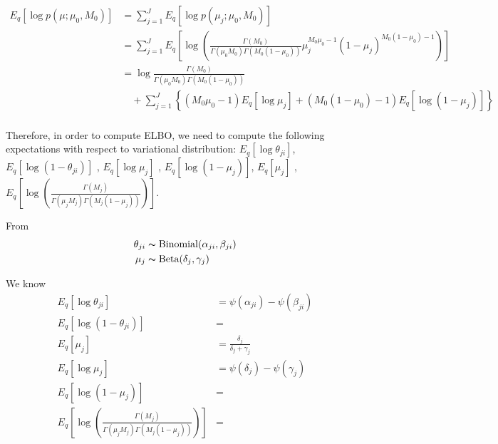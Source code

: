 \documentclass[11pt,reqno]{amsart}
\begin{document}
\begin{equation}
\begin{split}
\label{mu}
E_q \left[ \log p\left(\mu ; \mu_0, M_0 \right)\right] &= \sum_{j=1}^{J} E_q  \left[ \log p\left( \mu_j; \mu_0, M_0 \right) \right] \\
&= \sum_{j=1}^{J} E_q  \left[ \log \left( \frac{ \Gamma(M_0) } { \Gamma(\mu_0 M_0) \Gamma(M_0 (1-\mu_0)) } \mu_j^{M_0\mu_0 -1} (1 - \mu_j)^{M_0 ( 1 - \mu_0) - 1} \right) \right] \\
&= \log \frac{ \Gamma(M_0) } { \Gamma(\mu_0 M_0) \Gamma(M_0 (1-\mu_0))} \\
&\quad + \sum_{j=1}^{J} \left\lbrace (M_0\mu_0 -1)E_q  \left[ \log \mu_j \right] + (M_0 ( 1 - \mu_0) - 1) E_q  \left[ \log (1 - \mu_j)\right]\right\rbrace  \\
%
%
\end{split}
\end{equation}

Therefore, in order to compute ELBO, we need to compute the following expectations with respect to variational distribution: $ E_q \left[ \log \theta_{ji} \right] $, $ E_q\left[ \log \left( 1 - \theta_{ji}\right) \right] $ , $ E_q  \left[ \log \mu_j \right] $ , $ E_q  \left[ \log (1 - \mu_j)\right] $, $ E_q \left[ \mu_j \right] $ , $ E_q  \left[ \log \left( \frac{ \Gamma(M_j) } { \Gamma(\mu_j M_j) \Gamma(M_j (1-\mu_j)) }\right) \right] $.

From 
\begin{align}
\theta_{ji} &\thicksim \text{Binomial}(\alpha_{ji}, \beta_{ji}) \nonumber \\
\mu_j &\thicksim \text{Beta}(\delta_j, \gamma_j) \nonumber
\end{align}

We know
\begin{align}
E_q \left[ \log \theta_{ji} \right] &= \psi(\alpha_{ji}) - \psi(\beta_{ji}) \nonumber \\
E_q\left[ \log \left( 1 - \theta_{ji}\right) \right]&= \nonumber \\
E_q \left[ \mu_j \right] &= \frac{\delta_j}{\delta_j + \gamma_j} \nonumber \\
E_q  \left[ \log \mu_j \right] &= \psi(\delta_j) - \psi(\gamma_j) \nonumber \\
E_q  \left[ \log (1 - \mu_j)\right] &= \nonumber \\
E_q  \left[ \log \left( \frac{ \Gamma(M_j) } { \Gamma(\mu_j M_j) \Gamma(M_j (1-\mu_j)) }\right) \right]&= \nonumber 
\end{align}
\end{document}
